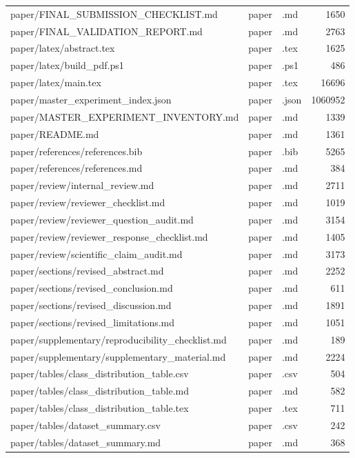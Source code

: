 \begin{tabular}{lllr}
paper/FINAL\_SUBMISSION\_CHECKLIST.md & paper & .md & 1650 \\
paper/FINAL\_VALIDATION\_REPORT.md & paper & .md & 2763 \\
paper/latex/abstract.tex & paper & .tex & 1625 \\
paper/latex/build\_pdf.ps1 & paper & .ps1 & 486 \\
paper/latex/main.tex & paper & .tex & 16696 \\
paper/master\_experiment\_index.json & paper & .json & 1060952 \\
paper/MASTER\_EXPERIMENT\_INVENTORY.md & paper & .md & 1339 \\
paper/README.md & paper & .md & 1361 \\
paper/references/references.bib & paper & .bib & 5265 \\
paper/references/references.md & paper & .md & 384 \\
paper/review/internal\_review.md & paper & .md & 2711 \\
paper/review/reviewer\_checklist.md & paper & .md & 1019 \\
paper/review/reviewer\_question\_audit.md & paper & .md & 3154 \\
paper/review/reviewer\_response\_checklist.md & paper & .md & 1405 \\
paper/review/scientific\_claim\_audit.md & paper & .md & 3173 \\
paper/sections/revised\_abstract.md & paper & .md & 2252 \\
paper/sections/revised\_conclusion.md & paper & .md & 611 \\
paper/sections/revised\_discussion.md & paper & .md & 1891 \\
paper/sections/revised\_limitations.md & paper & .md & 1051 \\
paper/supplementary/reproducibility\_checklist.md & paper & .md & 189 \\
paper/supplementary/supplementary\_material.md & paper & .md & 2224 \\
paper/tables/class\_distribution\_table.csv & paper & .csv & 504 \\
paper/tables/class\_distribution\_table.md & paper & .md & 582 \\
paper/tables/class\_distribution\_table.tex & paper & .tex & 711 \\
paper/tables/dataset\_summary.csv & paper & .csv & 242 \\
paper/tables/dataset\_summary.md & paper & .md & 368 \\

\end{tabular}
